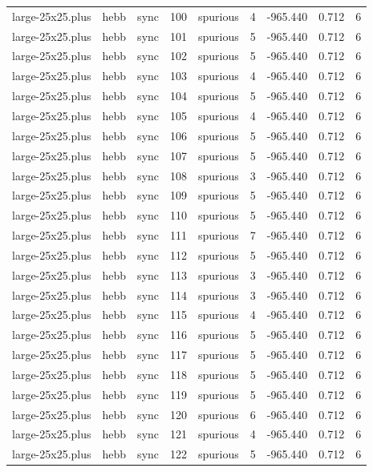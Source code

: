 \begin{tabular}{lllrlrrrr}
large-25x25.plus & hebb & sync & 100 & spurious & 4 & -965.440 & 0.712 & 6 \\
large-25x25.plus & hebb & sync & 101 & spurious & 5 & -965.440 & 0.712 & 6 \\
large-25x25.plus & hebb & sync & 102 & spurious & 5 & -965.440 & 0.712 & 6 \\
large-25x25.plus & hebb & sync & 103 & spurious & 4 & -965.440 & 0.712 & 6 \\
large-25x25.plus & hebb & sync & 104 & spurious & 5 & -965.440 & 0.712 & 6 \\
large-25x25.plus & hebb & sync & 105 & spurious & 4 & -965.440 & 0.712 & 6 \\
large-25x25.plus & hebb & sync & 106 & spurious & 5 & -965.440 & 0.712 & 6 \\
large-25x25.plus & hebb & sync & 107 & spurious & 5 & -965.440 & 0.712 & 6 \\
large-25x25.plus & hebb & sync & 108 & spurious & 3 & -965.440 & 0.712 & 6 \\
large-25x25.plus & hebb & sync & 109 & spurious & 5 & -965.440 & 0.712 & 6 \\
large-25x25.plus & hebb & sync & 110 & spurious & 5 & -965.440 & 0.712 & 6 \\
large-25x25.plus & hebb & sync & 111 & spurious & 7 & -965.440 & 0.712 & 6 \\
large-25x25.plus & hebb & sync & 112 & spurious & 5 & -965.440 & 0.712 & 6 \\
large-25x25.plus & hebb & sync & 113 & spurious & 3 & -965.440 & 0.712 & 6 \\
large-25x25.plus & hebb & sync & 114 & spurious & 3 & -965.440 & 0.712 & 6 \\
large-25x25.plus & hebb & sync & 115 & spurious & 4 & -965.440 & 0.712 & 6 \\
large-25x25.plus & hebb & sync & 116 & spurious & 5 & -965.440 & 0.712 & 6 \\
large-25x25.plus & hebb & sync & 117 & spurious & 5 & -965.440 & 0.712 & 6 \\
large-25x25.plus & hebb & sync & 118 & spurious & 5 & -965.440 & 0.712 & 6 \\
large-25x25.plus & hebb & sync & 119 & spurious & 5 & -965.440 & 0.712 & 6 \\
large-25x25.plus & hebb & sync & 120 & spurious & 6 & -965.440 & 0.712 & 6 \\
large-25x25.plus & hebb & sync & 121 & spurious & 4 & -965.440 & 0.712 & 6 \\
large-25x25.plus & hebb & sync & 122 & spurious & 5 & -965.440 & 0.712 & 6 \\

\end{tabular}

